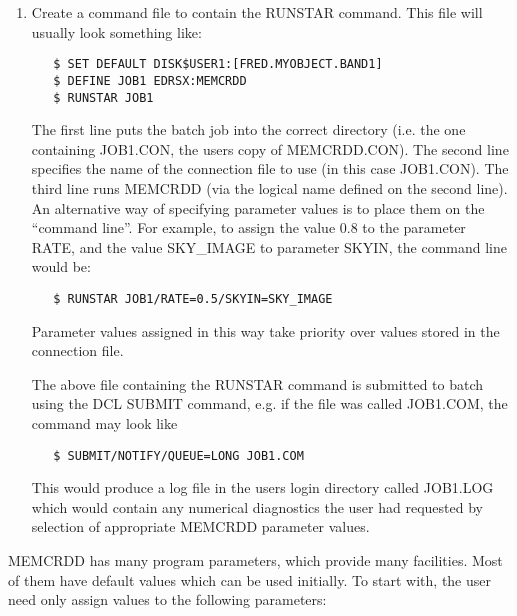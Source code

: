 \begin{enumerate}
\item Create a command file to contain the RUNSTAR command. This file will usually
look something like:

\begin{verbatim}
   $ SET DEFAULT DISK$USER1:[FRED.MYOBJECT.BAND1]
   $ DEFINE JOB1 EDRSX:MEMCRDD
   $ RUNSTAR JOB1
\end{verbatim}

The first line puts the batch job into the correct directory (i.e. the one
containing JOB1.CON, the users copy of MEMCRDD.CON). The second line specifies
the name of the connection file to use (in this case JOB1.CON). The third line
runs MEMCRDD (via the logical name defined on the second line). An  alternative
way of specifying parameter values is to place them on the ``command  line''.
For example, to assign the value 0.8 to the parameter RATE, and the  value
SKY\_IMAGE to parameter SKYIN, the command line would be:

\begin{verbatim}
   $ RUNSTAR JOB1/RATE=0.5/SKYIN=SKY_IMAGE
\end{verbatim}
Parameter values assigned in this way take priority over values stored in the
connection file.

The above file containing the RUNSTAR command is submitted to batch using the
DCL SUBMIT command, e.g. if the file was called JOB1.COM, the command may
look like

\begin{verbatim}
   $ SUBMIT/NOTIFY/QUEUE=LONG JOB1.COM
\end{verbatim}

This would produce a log file in the users login directory called JOB1.LOG
which would contain any numerical diagnostics the user had requested by
selection of appropriate MEMCRDD parameter values.

\end{enumerate}

MEMCRDD has many program parameters, which provide many facilities. Most of
them  have default values which can be used initially. To start with, the user
need  only assign values to the following parameters:

